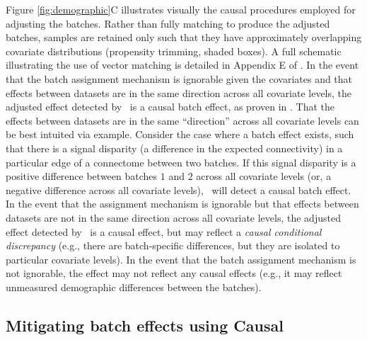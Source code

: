 {{{Figure \ref{fig:demographic}C illustrates visually the causal procedures employed for adjusting the batches}. Rather than fully matching to produce the adjusted batches, samples are retained only such that they have approximately overlapping covariate distributions (propensity trimming, shaded boxes). A full schematic illustrating the use of vector matching is detailed in Appendix E of \cite{Bridgeford2023Jul}. In the event that the batch assignment mechanism is ignorable given the covariates and that effects between datasets are in the same direction across all covariate levels, the adjusted effect detected by \ccdcorr~is a causal batch effect, as proven in \cite{Bridgeford2023Jul}. That the effects between datasets are in the same ``direction'' across all covariate levels can be best intuited via example. Consider the case where a batch effect exists, such that there is a signal disparity (a difference in the expected connectivity) in a particular edge of a connectome between two batches. If this signal disparity is a positive difference between batches $1$ and $2$ across all covariate levels (or, a negative difference across all covariate levels), \ccdcorr~will detect a causal batch effect. In the event that the assignment mechanism is ignorable but that effects between datasets are not in the same direction across all covariate levels, the adjusted effect detected by \ccdcorr~is a causal effect, but may reflect a \textit{causal conditional discrepancy} (e.g., there are batch-specific differences, but they are isolated to particular covariate levels). In the event that the batch assignment mechanism is not ignorable, the effect may not reflect any causal effects (e.g., it may reflect unmeasured demographic differences between the batches).}}


\subsection{Mitigating batch effects using Causal \Combat}



